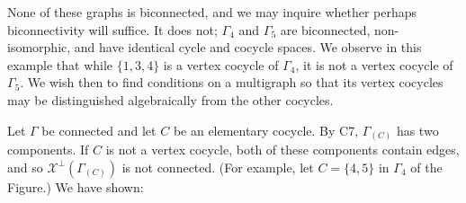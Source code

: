 None of these graphs is biconnected, and we may inquire whether perhaps biconnectivity will suffice. It does not; $\Gamma_4$ and $\Gamma_5$ are biconnected, non-isomorphic, and have identical cycle and cocycle spaces. We observe in this example that while $\{1, 3, 4\}$ is a vertex cocycle of $\Gamma_4$, it is not a vertex cocycle of $\Gamma_5$. We wish then to find conditions on a multigraph so that its vertex cocycles may be distinguished algebraically from the other cocycles.

Let $\Gamma$ be connected and let $C$ be an elementary cocycle. By C7, $\Gamma_{(C)}$ has two components. If $C$ is not a vertex cocycle, both of these components contain edges, and so $\mathcal{X}^{\perp}(\Gamma_{(C)})$ is not connected. (For example, let $C = \{4, 5\}$ in $\Gamma_4$ of the Figure.) We have shown:
